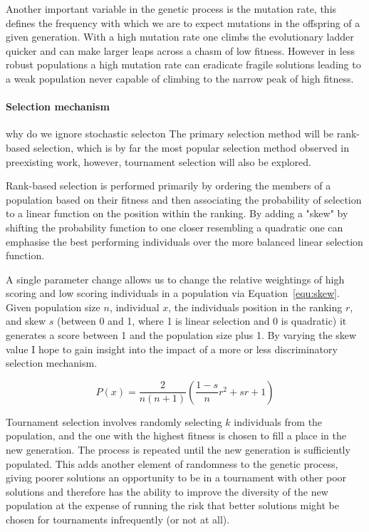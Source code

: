 Another important variable in the genetic process is the mutation rate, this defines the
frequency with which we are to expect mutations in the offspring of a given generation.
With a high mutation rate one climbs the evolutionary ladder quicker and can make larger
leaps across a chasm of low fitness. However in less robust populations a high mutation rate
can eradicate fragile solutions leading to a weak population never capable of
climbing to the narrow peak of high fitness.

\paragraph{Selection mechanism}
\todo why do we ignore stochastic selecton
The primary selection method will be rank-based selection, which is by far
the most popular selection method observed in preexisting work, however,
tournament selection will also be explored.

Rank-based selection is performed primarily by ordering the members of a population
based on their fitness and then associating the probability of selection to a
linear function on the
position within the ranking. By adding a "skew" by shifting the probability function
to one closer resembling a quadratic one can emphasise the best performing
individuals over the more balanced linear selection function.

A single parameter change allows us to change the relative weightings of high scoring
and low scoring individuals in a population via Equation~\ref{equ:skew}. Given
population size $n$, individual $x$, the individuals position in the ranking $r$, and
skew $s$ (between 0 and 1, where 1 is linear selection and 0 is quadratic) it
generates a score between 1 and the population size plus 1. By varying the skew
value I hope to gain insight into the impact of a more or less discriminatory
selection mechanism.

\begin{equation}
	\label{equ:skew}
	P(x) = \frac{2}{n(n+1)} (\frac{1-s}{n}r^2 + sr + 1)
\end{equation}

Tournament selection involves randomly selecting $k$ individuals from the
population, and the one with the highest fitness is chosen to fill a place
in the new generation. The process is repeated until the new generation is
sufficiently populated. This adds another element of randomness to the
genetic process, giving poorer solutions an opportunity to be in a tournament
with other poor solutions and therefore has the ability to improve the
diversity of the new population at the expense of running the risk that
better solutions might be chosen for tournaments infrequently (or not at
all).

